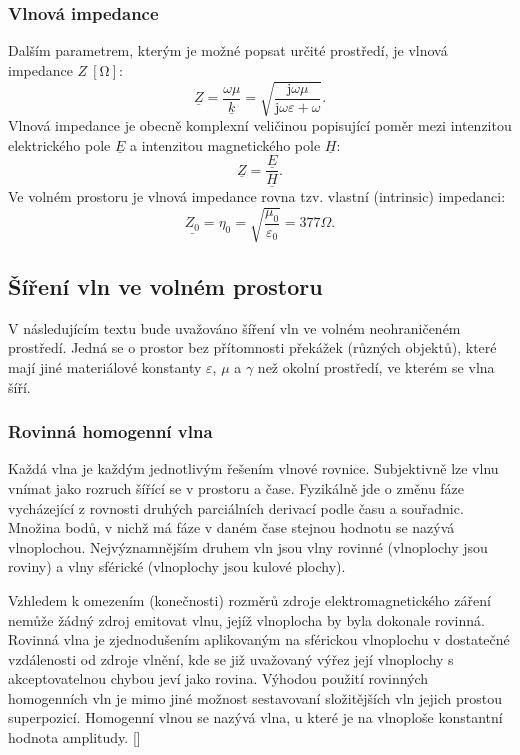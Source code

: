\documentclass[12pt,a4paper,oneside]{article}
\numberwithin{equation}{section} %
\numberwithin{figure}{section} %
\numberwithin{table}{section} %
\newcommand{\mj}{\mathrm{j}} %
\newcommand{\faz}[1]{{\underline{#1}}} %
\begin{document}
\subsubsection*{Vlnová impedance}
Dalším parametrem, kterým je možné popsat určité prostředí, je vlnová impedance $Z ~\mathrm{[\Omega]}$:
\begin{equation}
\faz{Z} = \frac{\omega \mu}{\faz{k}} = \sqrt{\dfrac{\mj \omega \mu}{\mj \omega \varepsilon + \omega}} .
\end{equation}
Vlnová impedance je obecně komplexní veličinou popisující poměr mezi intenzitou elektrického pole $\faz{E}$ a intenzitou magnetického pole $\faz{H}$:
\begin{equation}
\faz{Z} = \frac{\faz{E}}{\faz{H}} .
\end{equation}
Ve volném prostoru je vlnová impedance rovna tzv. vlastní (intrinsic) impedanci:
\begin{equation}
\faz{Z_0} = \eta _0 = \sqrt{\dfrac{\mu _0}{\varepsilon _0}} = 377 \Omega .
\end{equation}


\subsection{Šíření vln ve volném prostoru}
V následujícím textu bude uvažováno šíření vln ve volném neohraničeném prostředí. Jedná se o prostor bez přítomnosti překážek (různých objektů), které mají jiné materiálové konstanty $\varepsilon$, $\mu$ a $\gamma$ než okolní prostředí, ve kterém se vlna šíří.

\subsubsection{Rovinná homogenní vlna}
Každá vlna je každým jednotlivým řešením vlnové rovnice. Subjektivně lze vlnu vnímat jako rozruch šířící se v prostoru a čase. Fyzikálně jde o změnu fáze vycházející z rovnosti druhých parciálních derivací podle času a souřadnic. Množina bodů, v nichž má fáze v daném čase stejnou hodnotu se nazývá vlnoplochou. Nejvýznamnějším druhem vln jsou vlny rovinné (vlnoplochy jsou roviny) a vlny sférické (vlnoplochy jsou kulové plochy). 

Vzhledem k omezením (konečnosti) rozměrů zdroje elektromagnetického záření nemůže žádný zdroj emitovat vlnu, jejíž vlnoplocha by byla dokonale rovinná. Rovinná vlna je zjednodušením aplikovaným na sférickou vlnoplochu v dostatečné vzdálenosti od zdroje vlnění, kde se již uvažovaný výřez její vlnoplochy s akceptovatelnou chybou jeví jako rovina. Výhodou použití rovinných homogenních vln je mimo jiné možnost sestavovaní složitějších vln jejich prostou superpozicí. Homogenní vlnou se nazývá vlna, u které je na vlnoploše konstantní hodnota amplitudy. [\cite{RovinnaVlna}]
\end{document}
